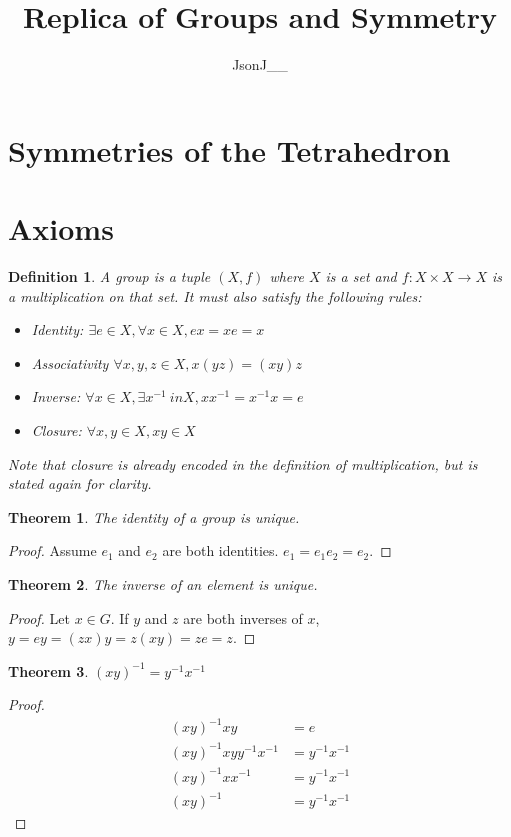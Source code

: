 \documentclass{article}
\title{Replica of Groups and Symmetry}
\author{JsonJ\_\_}
\newtheorem{theorem}{Theorem}[section]
\newtheorem{definition}{Definition}[section]
\begin{document}
\maketitle

\section{Symmetries of the Tetrahedron}
\section{Axioms}

\begin{definition}
    A group is a tuple $(X,f)$ where $X$ is a set and $f : X \times X \to X$ is a multiplication on that set.
    It must also satisfy the following rules:
    \begin{itemize}[noitemsep]
        \item Identity: $\exists e \in X, \forall x \in X, ex = xe = x$
        \item Associativity $\forall x,y,z \in X, x(yz) = (xy)z$
        \item Inverse: $\forall x \in X, \exists x^{-1} \ in X, xx^{-1} = x^{-1}x = e$
        \item Closure: $\forall x,y \in X, xy \in X$
    \end{itemize}
    Note that closure is already encoded in the definition of multiplication, but is stated again for clarity.
\end{definition}

\begin{theorem}
    The identity of a group is unique.
\end{theorem}
\begin{proof}
    Assume $e_{1}$ and $e_{2}$ are both identities.
    $e_{1} = e_{1}e_{2} = e_{2}$.
\end{proof}

\begin{theorem}
    The inverse of an element is unique.
\end{theorem}
\begin{proof}
    Let $x \in G$.
    If $y$ and $z$ are both inverses of $x$,
    $y = ey = (zx)y = z(xy) = ze = z$.
\end{proof}

\begin{theorem}
    $(xy)^{-1} = y^{-1}x^{-1}$
\end{theorem}
\begin{proof}
    \[
        \begin{aligned}
            (xy)^{-1}xy &= e \\
            (xy)^{-1}xyy^{-1}x^{-1} &= y^{-1}x^{-1} \\
            (xy)^{-1}xx^{-1} &= y^{-1}x^{-1} \\
            (xy)^{-1} &= y^{-1}x^{-1}
        \end{aligned}
    \]
\end{proof}
\end{document}
